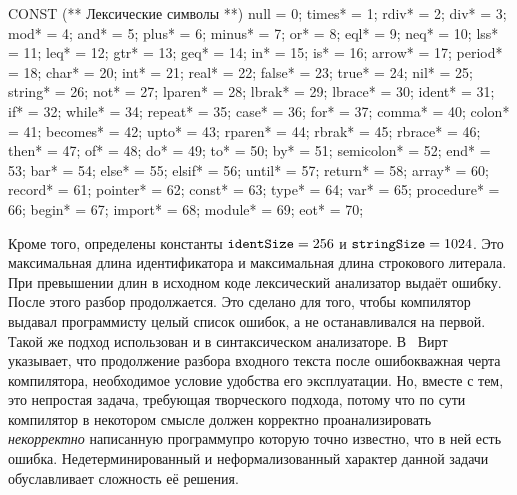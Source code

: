 \documentclass[utf8]{lgu}
\newcommand{\tire}{\unskip\nobreak\thinspace\textemdash\thinspace}
\newcommand{\code}[1]{{\normalsize\texttt{#1}}}
\begin{document}
\begin{listing}[H]
\caption{Полный список лексических символов языка Оберон}
\vspace{-17pt}
\label{lst:SymbolConstants}
\begin{modula2}
CONST
  (** Лексические символы **)
  null        =  0;    times*     = 1;      rdiv*      = 2;
  div*        =  3;    mod*      = 4;      and*      = 5;
  plus*       =  6;    minus*    = 7;      or*        = 8;
  eql*        =  9;    neq*      = 10;     lss*       = 11;
  leq*        = 12;    gtr*       = 13;     geq*      = 14;
  in*         = 15;     is*        = 16;     arrow*   = 17;
  period*     = 18;    char*      = 20;    int*       = 21;
  real*       = 22;    false*     = 23;    true*     = 24;
  nil*         = 25;    string*    = 26;    not*      = 27;
  lparen*     = 28;    lbrak*     = 29;    lbrace*   = 30;
  ident*      = 31;     if*        = 32;    while*     = 34;
  repeat*    = 35;    case*      = 36;    for*       = 37;
  comma*    = 40;    colon*      = 41;    becomes* = 42;
  upto*      = 43;    rparen*    = 44;    rbrak*    = 45;
  rbrace*    = 46;    then*      = 47;    of*        = 48;
  do*        = 49;    to*         = 50;    by*       = 51;
  semicolon* = 52;    end*        = 53;    bar*      = 54;
  else*      = 55;    elsif*       = 56;    until*     = 57;
  return*    = 58;    array*      = 60;    record*   = 61;
  pointer*   = 62;    const*      = 63;    type*     = 64;
  var*       = 65;    procedure*  = 66;    begin*    = 67;
  import*    = 68;    module*     = 69;    eot*      = 70;
\end{modula2}
\end{listing}

Кроме того, определены константы $\code{identSize} = 256$ и $\code{stringSize} = 1024$. Это максимальная длина идентификатора и максимальная длина строкового литерала. При превышении длин в исходном коде лексический анализатор выдаёт ошибку. После этого разбор продолжается. Это сделано для того, чтобы компилятор выдавал программисту целый список ошибок, а не останавливался на первой. Такой же подход использован и в синтаксическом анализаторе. В~\cite{WirthCompiler} Вирт указывает, что продолжение разбора входного текста после ошибок\tire важная черта компилятора, необходимое условие удобства его эксплуатации. Но, вместе с тем, это непростая задача, требующая творческого подхода, потому что по сути компилятор в некотором смысле должен корректно проанализировать \textit{некорректно} написанную программу\tire про которую точно известно, что в ней есть ошибка. Недетерминированный и неформализованный характер данной задачи обуславливает сложность её решения.
\end{document}
